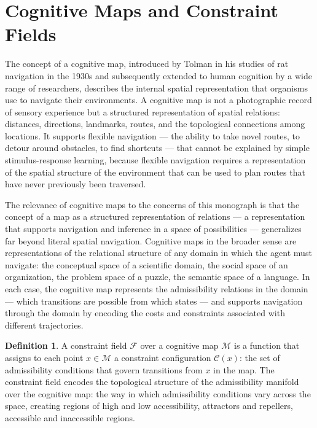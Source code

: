 \documentclass[12pt,openany]{book}
\theoremstyle{plain}
\theoremstyle{definition}
\newtheorem{definition}[theorem]{Definition}
\theoremstyle{remark}
\begin{document}
\section{Cognitive Maps and Constraint Fields}

The concept of a cognitive map, introduced by Tolman in his studies of rat navigation in the 1930s and subsequently extended to human cognition by a wide range of researchers, describes the internal spatial representation that organisms use to navigate their environments. A cognitive map is not a photographic record of sensory experience but a structured representation of spatial relations: distances, directions, landmarks, routes, and the topological connections among locations. It supports flexible navigation — the ability to take novel routes, to detour around obstacles, to find shortcuts — that cannot be explained by simple stimulus-response learning, because flexible navigation requires a representation of the spatial structure of the environment that can be used to plan routes that have never previously been traversed.

The relevance of cognitive maps to the concerns of this monograph is that the concept of a map as a structured representation of relations — a representation that supports navigation and inference in a space of possibilities — generalizes far beyond literal spatial navigation. Cognitive maps in the broader sense are representations of the relational structure of any domain in which the agent must navigate: the conceptual space of a scientific domain, the social space of an organization, the problem space of a puzzle, the semantic space of a language. In each case, the cognitive map represents the admissibility relations in the domain — which transitions are possible from which states — and supports navigation through the domain by encoding the costs and constraints associated with different trajectories.

\begin{definition}
A constraint field $\mathcal{F}$ over a cognitive map $\mathcal{M}$ is a function that assigns to each point $x \in \mathcal{M}$ a constraint configuration $\mathcal{C}(x)$: the set of admissibility conditions that govern transitions from $x$ in the map. The constraint field encodes the topological structure of the admissibility manifold over the cognitive map: the way in which admissibility conditions vary across the space, creating regions of high and low accessibility, attractors and repellers, accessible and inaccessible regions.
\end{definition}
\end{document}
